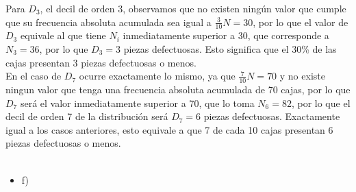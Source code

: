 \documentclass[a4paper,12pt]{article}
\begin{document}
Para $D_3$, el decil de orden 3, observamos que no existen ningún valor que cumple que su frecuencia absoluta acumulada sea igual a $\frac{3}{10}N = 30$, por lo que el valor de $D_3$ equivale al que tiene $N_i$ inmediatamente superior a 30, que corresponde a $N_3 = 36$, por lo que $D_3 = 3$ piezas defectuosas. Esto significa que el 30\% de las cajas presentan 3 piezas defectuosas o menos.\\
En el caso de $D_7$ ocurre exactamente lo mismo, ya que $\frac{7}{10}N = 70$ y no existe ningun valor que tenga una frecuencia absoluta acumulada de 70 cajas, por lo que $D_7$ será el valor inmediatamente superior a 70, que lo toma $N_6 = 82$, por lo que el decil de orden 7 de la distribución será $D_7 =6$ piezas defectuosas. Exactamente igual a los casos anteriores, esto equivale a que 7 de cada 10 cajas presentan 6 piezas defectuosas o menos.\\ \\ 

\begin {itemize}
    \item [f)]  
\end {itemize}
\end{document}
